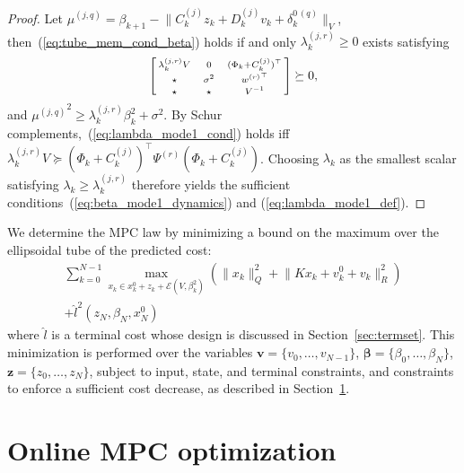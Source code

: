 \documentclass{IEEEtran}
\theoremstyle{definition}
\theoremstyle{remark}
\begin{document}
\begin{proof}
Let $\mu^{(j,q)} = \beta_{k+1} - \lVert C^{(j)}_k z_k + D^{(j)}_k v_k + \delta^{0\,(q)}_k \rVert_V$, then~(\ref{eq:tube_mem_cond_beta}) holds if and only $\lambda_k^{(j,r)} \geq 0$ exists satisfying%
\def\strut{\rule{0pt}{8pt}}%
\begin{equation}\label{eq:lambda_mode1_cond}
\left[\begin{smallmatrix}
\lambda_k^{(j,r)} V & ~~~0~~~ & (\Phi_k + C^{(j)}_k)^\top 
\\
\star\strut & \sigma^2 & {w^{(r)}}^\top
\\
\star\strut & \star & V^{-1}
\end{smallmatrix}\right] \succeq 0 ,
\end{equation}
and ${\mu^{(j,q)}}^2 \geq  \lambda_k^{(j,r)}\beta_{k}^2 + \sigma^2$.
By Schur complements,~(\ref{eq:lambda_mode1_cond}) holds iff $\lambda_k^{(j,r)} V \succeq (\Phi_k + C^{(j)}_k)^\top 
\Psi^{(r)}(\Phi_k + C^{(j)}_k)$.
Choosing $\lambda_k$ as the smallest scalar satisfying $\lambda_k \geq \lambda_k^{(j,r)}$ therefore yields the sufficient conditions~{(\ref{eq:beta_mode1_dynamics}) and
(\ref{eq:lambda_mode1_def})}.
\end{proof} 

We determine the MPC law by minimizing a bound on the maximum over the ellipsoidal tube of the predicted cost:
\begin{multline}\label{eq:maxcost}
\sum_{k=0}^{N-1} \max_{x_k \in x^0_k + z_k + \mathcal{E}(V,\beta_k^2)}
  ( \lVert x_k \rVert^2_Q +  \lVert Kx_k +  v^0_k+ v_k \rVert^2_R) \\
  + \hat{l}^2(z_N,\beta_N,x^0_N)
\end{multline}
where $\hat{l}$ is a terminal cost whose design is discussed in Section~\ref{sec:termset}.
This minimization is performed over the variables $\mathbf{v}=\{v_0,\ldots,v_{N-1}\}$, $\boldsymbol{\beta} = \{\beta_0,\ldots,\beta_N\}$, $\mathbf{z} =\{z_0,\ldots,z_N\}$, 
subject to input, state, and terminal constraints, and constraints to enforce a sufficient cost decrease, as described in Section~\ref{sec:opt}.

\section{Online MPC optimization}\label{sec:opt}
\end{document}
